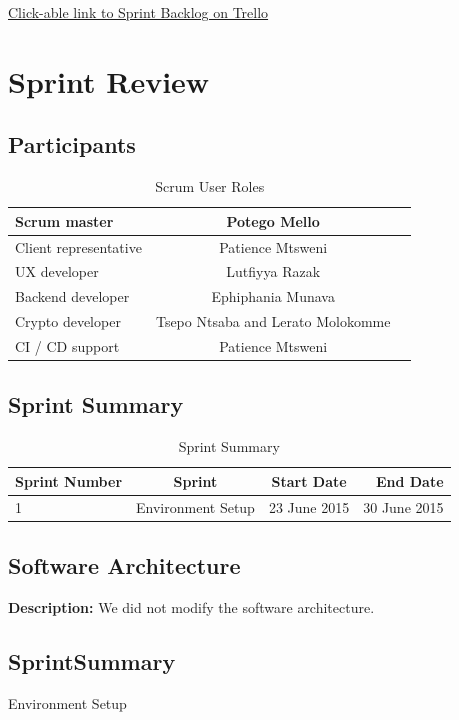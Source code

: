 \documentclass[a4paper]{article}
\begin{document}
\href{https://trello.com/b/hBJF6EUd}{Click-able link to Sprint Backlog on Trello}
\newpage

\section{Sprint Review}

\subsection{Participants}
\begin{table}[h]
\centering
\caption{Scrum User Roles}
\label{User Roles}
\begin{center} 
\begin{tabular}{| l | c | r |}
\hline
Scrum master  & Potego Mello\\ \hline
Client representative  & Patience Mtsweni\\ \hline
UX developer  & Lutfiyya Razak\\ \hline
Backend developer  & Ephiphania Munava\\\hline
Crypto developer  & Tsepo Ntsaba and Lerato Molokomme\\ \hline
CI / CD support  & Patience Mtsweni \\ 
\hline
\end{tabular}
\end{center}
\end{table}

\subsection{Sprint Summary}
\begin{table}[h]
\centering
\caption{Sprint Summary}
\begin{tabular}{| l | c | c | r |}
\hline
Sprint Number & Sprint & Start Date & End Date\\ \hline
1 & Environment Setup & 23 June 2015 & 30 June 2015 \\
\hline
\end{tabular}
\end{table}


\subsection{Software Architecture}
\textbf{Description: }We did not modify the software architecture. \\

\subsection{SprintSummary}
Environment Setup 
\end{document}
